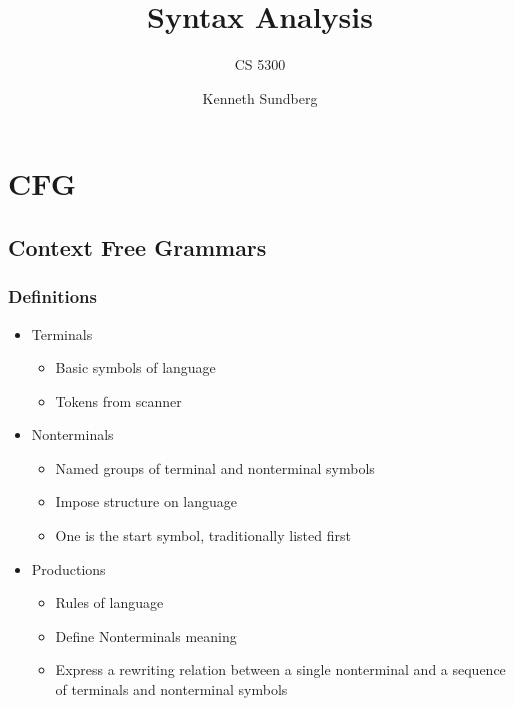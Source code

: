 \documentclass[usepdftitle=false,professionalfonts,compress ]{beamer}
\title{Syntax Analysis}
\subtitle{CS 5300}
\author{Kenneth Sundberg}
\date{}
\begin{document}
\frame[plain]{
	\frametitle{}
	\titlepage
	\vspace{-0.5cm}
	\begin{center}
	\end{center}
}
\frame{
	\tableofcontents[hideallsubsections]
}
















\section{CFG}
		
\subsection{Context Free Grammars}

{
\begin{frame}\frametitle{Definitions}

	\begin{itemize}
	\item Terminals

	\begin{itemize}
	\item Basic symbols of language
			\item Tokens from scanner
				\end{itemize}

			\item Nonterminals

	\begin{itemize}
	\item Named groups of terminal and nonterminal symbols
			\item Impose structure on language
			\item One is the start symbol, traditionally listed first
				\end{itemize}

			\item Productions

	\begin{itemize}
	\item Rules of language
			\item Define Nonterminals meaning
			\item Express a rewriting relation between a single nonterminal and a sequence of terminals and nonterminal symbols
				\end{itemize}

				\end{itemize}

\end{frame}}
\end{document}
